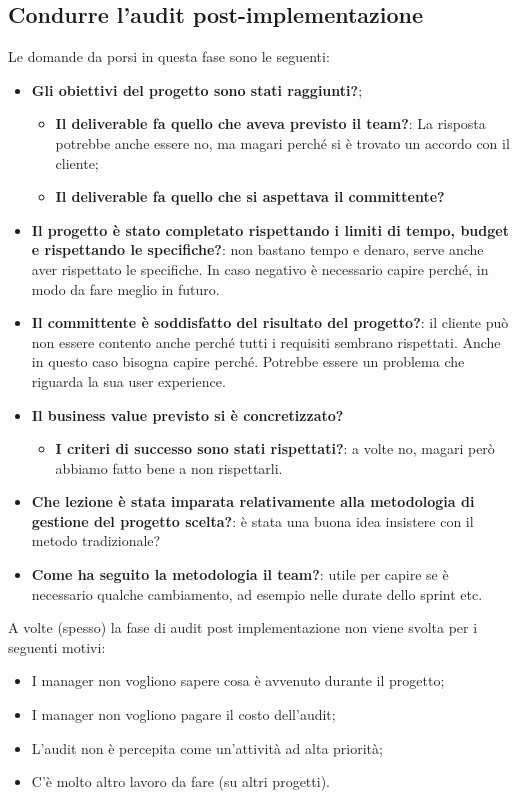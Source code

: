 \subsection{Condurre l’audit post-implementazione}
Le domande da porsi in questa fase sono le seguenti:
\begin{itemize}
	\item \textbf{Gli obiettivi del progetto sono stati raggiunti?};
	\begin{itemize}
		\item \textbf{Il deliverable fa quello che aveva previsto il team?}: La risposta potrebbe anche essere no, ma magari perché si è trovato un accordo con il cliente;
		\item \textbf{Il deliverable fa quello che si aspettava il committente?}
	\end{itemize}
	\item \textbf{Il progetto è stato completato rispettando i limiti di tempo, budget e rispettando le specifiche?}: non bastano tempo e denaro, serve anche aver rispettato le specifiche. In caso negativo è necessario capire perché, in modo da fare meglio in futuro.
	\item \textbf{Il committente è soddisfatto del risultato del progetto?}: il cliente può non essere contento anche perché tutti i requisiti sembrano rispettati. Anche in questo caso bisogna capire perché. Potrebbe essere un problema che riguarda la sua user experience.
	\item \textbf{Il business value previsto si è concretizzato?}
	\begin{itemize}
		\item \textbf{I criteri di successo sono stati rispettati?}: a volte no, magari però abbiamo fatto bene a non rispettarli.
	\end{itemize}
	\item \textbf{Che lezione è stata imparata relativamente alla metodologia di gestione del progetto scelta?}: è stata una buona idea insistere con il metodo tradizionale?
	\item \textbf{Come ha seguito la metodologia il team?}: utile per capire se è necessario qualche cambiamento, ad esempio nelle durate dello sprint etc.
\end{itemize}
A volte (spesso) la fase di audit post implementazione non viene svolta per i seguenti motivi:
\begin{itemize}
	\item I manager non vogliono sapere cosa è avvenuto durante il progetto;
	\item I manager non vogliono pagare il costo dell’audit;
	\item L’audit non è percepita come un’attività ad alta priorità;
	\item C’è molto altro lavoro da fare (su altri progetti).
\end{itemize}
